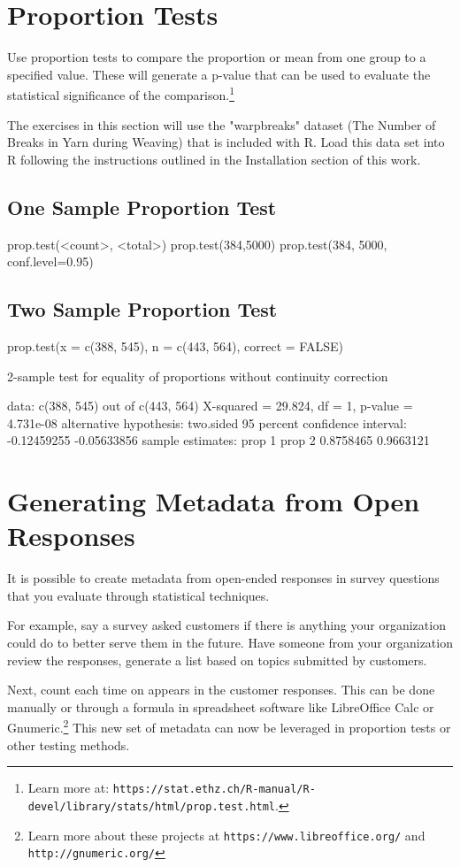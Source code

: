 
\section{Proportion Tests}
Use proportion tests to compare the proportion or mean from one group to a specified value. These will generate a p-value that can be used to evaluate the statistical significance of the comparison.\footnote{Learn more at: \texttt{https://stat.ethz.ch/R-manual/R-devel/library/stats/html/prop.test.html}.}

The exercises in this section will use the "warpbreaks" dataset (The Number of Breaks in Yarn during Weaving) that is included with R. Load this data set into R following the instructions outlined in the Installation section of this work.

\subsection{One Sample Proportion Test}
prop.test(<count>, <total>)
prop.test(384,5000)
prop.test(384, 5000, conf.level=0.95)

\subsection{Two Sample Proportion Test}
prop.test(x = c(388, 545), n = c(443, 564), correct = FALSE)

2-sample test for equality of proportions without continuity
        correction

data:  c(388, 545) out of c(443, 564)
X-squared = 29.824, df = 1, p-value = 4.731e-08
alternative hypothesis: two.sided
95 percent confidence interval:
 -0.12459255 -0.05633856
sample estimates:
   prop 1    prop 2 
0.8758465 0.9663121 

\section{Generating Metadata from Open Responses}
It is possible to create metadata from open-ended responses in survey questions that you evaluate through statistical techniques.

For example, say a survey asked customers if there is anything your organization could do to better serve them in the future. Have someone from your organization review the responses, generate a list based on topics submitted by customers. 

Next, count each time on appears in the customer responses. This can be done manually or through a formula in spreadsheet software like LibreOffice Calc or Gnumeric.\footnote{Learn more about these projects at \texttt{https://www.libreoffice.org/} and \texttt{http://gnumeric.org/}} This new set of metadata can now be leveraged in proportion tests or other testing methods.